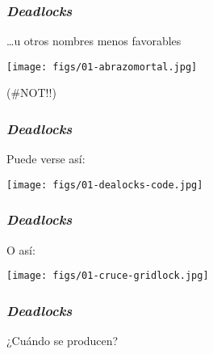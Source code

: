 \documentclass[letter]{beamer}
\begin{document}
\begin{frame}
  \frametitle{{\em Deadlocks}}

  \ldots u otros nombres menos favorables

  \begin{center}
    \texttt{[image: figs/01-abrazomortal.jpg]}
  \end{center}

  (\#NOT!!)
\end{frame}

\begin{frame}
  \frametitle{{\em Deadlocks}}

  Puede verse así:
  
  \begin{center}
    \texttt{[image: figs/01-dealocks-code.jpg]}
  \end{center}

\end{frame}

\begin{frame}
  \frametitle{{\em Deadlocks}}

  O así:

  \begin{center}
    \texttt{[image: figs/01-cruce-gridlock.jpg]}
  \end{center}


\end{frame}

\begin{frame}
  \frametitle{{\em Deadlocks}}

  ¿Cuándo se producen?
  
  

\end{frame}
\end{document}
